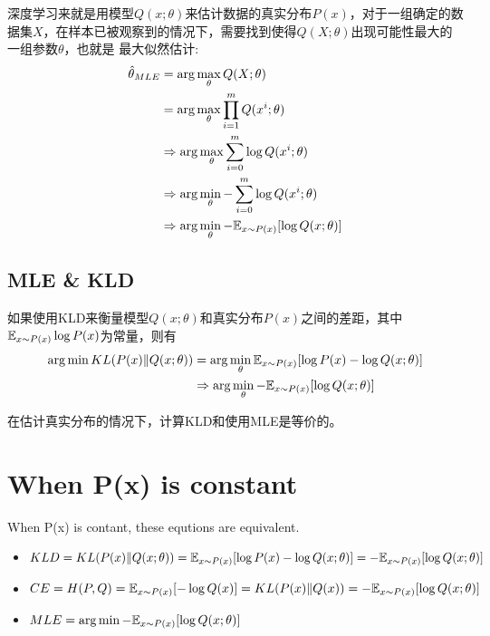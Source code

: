 深度学习来就是用模型$Q(x;\theta)$来估计数据的真实分布$P(x)$，对于一组确定的数据集$X$，在样本已被观察到的情况下，需要找到使得$Q(X; \theta)$出现可能性最大的一组参数$\theta$，也就是
最大似然估计:
\begin{equation}
    \begin{split}
        \hat{\theta}_{MLE}
        &= \arg \max_\theta Q(X; \theta) \\
        &= \arg \max_{\theta} \prod _{i=1}^m Q(x^i; \theta) \\
        &\Rightarrow \arg \max_{\theta} \sum_{i=0}^m \log Q(x^i; \theta) \\
        &\Rightarrow \arg \min_{\theta} - \sum_{i=0}^m \log Q(x^i; \theta) \\
        &\Rightarrow \arg \min_{\theta} - \mathbb{E} _{x \sim P(x)}[\log Q(x; \theta)]
    \end{split}
\end{equation}

\subsection{MLE \& KLD}
如果使用KLD来衡量模型$Q(x;\theta)$和真实分布$P(x)$之间的差距，其中$\mathbb{E}_{x \sim P(x)}\log P(x)$为常量，则有
\begin{equation}
    \begin{split}
    \arg \min KL(P(x)\|Q(x;\theta))
        &= \arg \min_{\theta} \mathbb{E}_{x \sim P(x)}[\log P(x) - \log Q(x;\theta)] \\
        &\Rightarrow \arg \min_{\theta} - \mathbb{E}_{x \sim P(x)}[\log Q(x;\theta)]
    \end{split}
\end{equation}

在估计真实分布的情况下，计算KLD和使用MLE是等价的。

\section{When P(x) is constant}
When P(x) is contant, these equtions are equivalent.
\begin{itemize}
    \item $ KLD = KL(P(x)\|Q(x;\theta)) = \mathbb{E}_{x \sim P(x)}[\log P(x) - \log Q(x; \theta)] = - \mathbb{E}_{x \sim P(x)}[\log Q(x;\theta)] $
    \item $ CE = H(P, Q) = \mathbb{E}_{x \sim P(x)}[- \log Q(x)] = KL(P(x)\|Q(x)) = - \mathbb{E}_{x \sim P(x)}[\log Q(x;\theta)] $
    \item $ MLE = \arg \min - \mathbb{E} _{x \sim P(x)}[\log Q(x; \theta)]$
\end{itemize}


